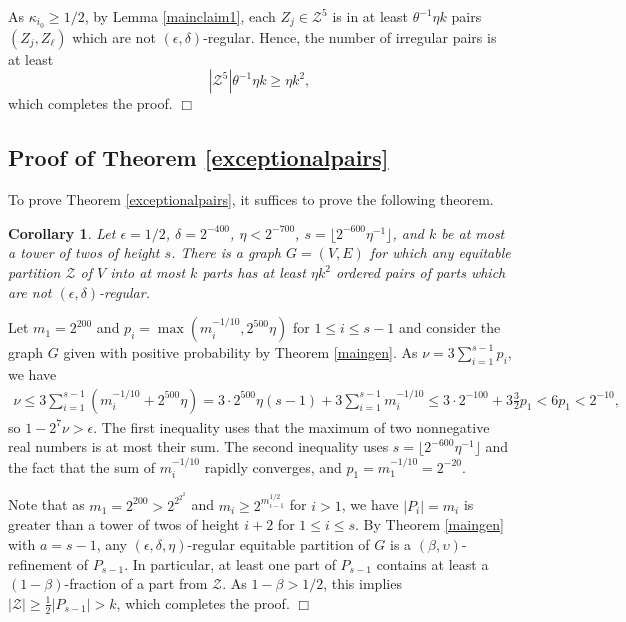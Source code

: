 \documentclass[11pt]{article}
\newtheorem{corollary}{Corollary}[section]
\newenvironment{proof}
      {\medskip\noindent{\bf Proof:}\hspace{1mm}}
      {\hfill$\Box$\medskip}
\begin{document}
\begin{proof}
As $\kappa_{i_0} \geq 1/2$, by Lemma \ref{mainclaim1}, each $Z_j \in
\mathcal{Z}^5$ is in at least $\theta^{-1}\eta k$ pairs $(Z_j,Z_{\ell})$ which
are not $(\epsilon,\delta)$-regular. Hence, the number of irregular pairs is at
least $$|\mathcal{Z}^5| \theta^{-1}\eta k \geq \eta k^2,$$ which completes the
proof.
\end{proof}

\subsection{Proof of Theorem \ref{exceptionalpairs}}\label{sectexcept}

To prove Theorem \ref{exceptionalpairs}, it suffices to prove the following
theorem.

\begin{corollary}
Let $\epsilon=1/2$, $\delta=2^{-400}$, $\eta<2^{-700}$, $s=\lfloor
2^{-600}\eta^{-1} \rfloor$, and $k$ be
at most a tower of twos of height $s$. There is a graph $G=(V,E)$ for which any
equitable partition $\mathcal{Z}$ of $V$ into at most $k$ parts has at least
$\eta k^2$ ordered pairs of parts which are not $(\epsilon,\delta)$-regular.
\end{corollary}
\begin{proof}
Let $m_1=2^{200}$ and $p_i=\max(m_i^{-1/10},2^{500}\eta)$ for $1 \leq i \leq s-1$
and consider the graph $G$ given
with positive probability by Theorem \ref{maingen}. As
$\nu=3\sum_{i=1}^{s-1}p_i$, we have
\begin{eqnarray*}
\nu \leq 3\sum_{i=1}^{s-1}(m_i^{-1/10}+2^{500}\eta)=3\cdot
2^{500}\eta(s-1)+3\sum_{i=1}^{s-1}m_i^{-1/10} \leq 3 \cdot 2^{-100}
+3\frac{3}{2}p_1 < 6p_1 < 2^{-10},
\end{eqnarray*}
so $1-2^7\nu>\epsilon$.
The first inequality uses that the maximum of two nonnegative real
numbers is at most their sum. The second inequality uses $s=\lfloor
2^{-600}\eta^{-1} \rfloor$ and the fact that the sum of $m_i^{-1/10}$ rapidly
converges, and $p_1 = m_1^{-1/10}=2^{-20}$.

Note that as $m_1=2^{200}>2^{2^{2^{2}}}$ and $m_i \geq 2^{m_{i-1}^{1/2}}$ for
$i>1$, we have $|P_i|=m_i$ is greater than a tower of twos of height $i+2$ for $1
\leq i \leq s$. By Theorem \ref{maingen} with $a=s-1$, any
$(\epsilon,\delta,\eta)$-regular equitable partition of $G$ is a
$(\beta,\upsilon)$-refinement of $P_{s-1}$. In particular, at least one part of
$P_{s-1}$ contains at least a $(1-\beta)$-fraction of a part from $\mathcal{Z}$.
As $1-\beta>1/2$, this implies $|\mathcal{Z}| \geq \frac{1}{2}|P_{s-1}| > k$, which
completes the proof.
\end{proof}
\end{document}
